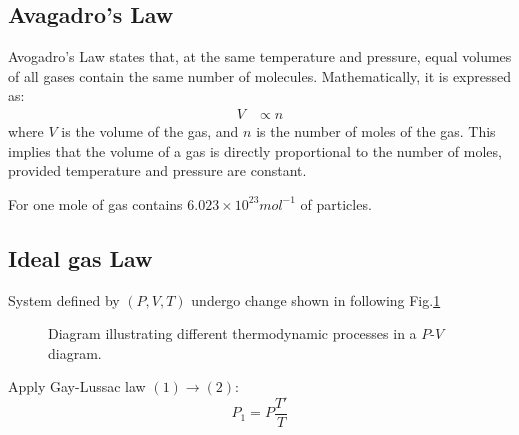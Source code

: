 \documentclass[fleqn,10pt]{SelfArx} %
\begin{document}
\subsection{Avagadro's Law}
Avogadro's Law states that, at the same temperature and pressure, equal volumes of all gases contain the same number of molecules. Mathematically, it is expressed as:
\begin{align}
    V &\propto n
\end{align}
where $V$ is the volume of the gas, and $n$ is the number of moles of the gas. This implies that the volume of a gas is directly proportional to the number of moles, provided temperature and pressure are constant.

For one mole of gas contains $6.023\times10^{23}mol^{-1}$ of particles.

\subsection{Ideal gas Law}
System defined by $(P,V,T)$ undergo change shown in following Fig.\ref{Idealgasprocess}

\begin{figure}[htbp]
    \centering
    \caption{Diagram illustrating different thermodynamic processes in a $P$-$V$ diagram.}
    \label{Idealgasprocess}
\end{figure}

Apply Gay-Lussac law $(1) \rightarrow (2)$:
\begin{equation} P_1 = P\frac{T'}{T} \label{eq:P'}\end{equation}
\end{document}
